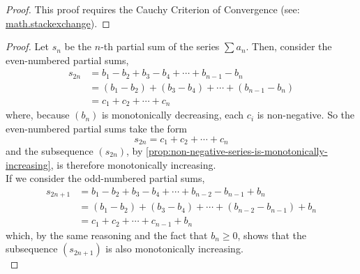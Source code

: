 \documentclass[../MathsNotesBase.tex]{subfiles}
\begin{document}
{	
		\bigskip
		\begin{proof}
			This proof requires the Cauchy Criterion of Convergence (see: \href{https://math.stackexchange.com/questions/475841/absolutely-convergent-series-has-constant-sum}{math.stackexchange}). 
		\end{proof}
		
		
		\bigskip
		\begin{proof}
			Let $s_n$ be the $n$-th partial sum of the series ${ \sum a_n }$. Then, consider the even-numbered partial sums,
			\[\begin{aligned}
				s_{2n} &= b_1 - b_2 + b_3 - b_4 + \cdots + b_{n-1} - b_n \\
				&= (b_1 - b_2) + (b_3 - b_4) + \cdots + (b_{n-1} - b_n) \\
				&= c_1 + c_2  + \cdots + c_n
			\end{aligned}\]
			where, because $(b_n)$ is monotonically decreasing, each $c_i$ is non-negative. So the even-numbered partial sums take the form
			\[ s_{2n} = c_1 + c_2 + \cdots + c_n \]
			and the subsequence $(s_{2n})$, by \autoref{prop:non-negative-series-is-monotonically-increasing}, is therefore monotonically increasing.\\
			
			If we consider the odd-numbered partial sums,
			\[\begin{aligned}
				s_{2n+1} &= b_1 - b_2 + b_3 - b_4 + \cdots + b_{n-2} - b_{n-1} + b_n \\
				&= (b_1 - b_2) + (b_3 - b_4) + \cdots + (b_{n-2} - b_{n-1}) + b_n \\
				&= c_1 + c_2  + \cdots + c_{n-1} + b_n
			\end{aligned}\]
			which, by the same reasoning and the fact that ${ b_n \geq 0 }$, shows that the subsequence $(s_{2n+1})$ is also monotonically increasing.\\
			

\end{proof}}
\end{document}
